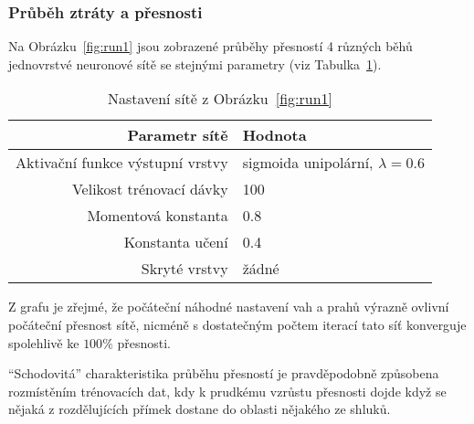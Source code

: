 \subsubsection{Průběh ztráty a přesnosti}
Na Obrázku~\ref{fig:run1} jsou zobrazené průběhy přesností 4 různých běhů jednovrstvé neuronové sítě se stejnými parametry (viz Tabulka~\ref{tab:set-acc-1}).
\begin{table}[ht!]
	\centering
	\begin{tabular}{|r|l|}
		\hline
		\textbf{Parametr sítě}           & \textbf{Hodnota}                     \\
		\hline
		Aktivační funkce výstupní vrstvy & sigmoida unipolární, $\lambda = 0.6$ \\
		Velikost trénovací dávky         & 100                                  \\
		Momentová konstanta              & 0.8                                  \\
		Konstanta učení                  & 0.4                                  \\
		Skryté vrstvy                    & žádné                                \\
		\hline
	\end{tabular}
	\caption{Nastavení sítě z Obrázku~\ref{fig:run1}}\label{tab:set-acc-1}
\end{table}
Z grafu je zřejmé, že počáteční náhodné nastavení vah a prahů výrazně ovlivní počáteční přesnost sítě, nicméně s dostatečným počtem iterací
tato síť konverguje spolehlivě ke $100\%$ přesnosti.

\enquote{Schodovitá} charakteristika průběhu přesností je pravděpodobně způsobena rozmístěním trénovacích dat,
kdy k prudkému vzrůstu přesnosti dojde když se nějaká z rozdělujících přímek dostane do oblasti nějakého ze shluků.

